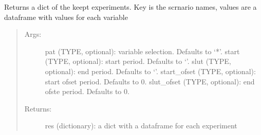 \documentclass[letterpaper,10pt,english]{sphinxmanual}
\begin{document}
\begin{fulllineitems}
\begin{fulllineitems}
\end{fulllineitems}


\begin{fulllineitems}
\label{\detokenize{core/modelclass:modelclass.Display_Mixin.keep_get_df}}
\pysigstartsignatures
{}
\pysigstopsignatures
\end{fulllineitems}


\begin{fulllineitems}
\label{\detokenize{core/modelclass:modelclass.Display_Mixin.keep_var_dict}}
\pysigstartsignatures
{}
\pysigstopsignatures
\sphinxAtStartPar
Returns a dict of the keept experiments. Key is the scrnario names, values are a dataframe with  values for each variable
\begin{quote}
\begin{description}
\item[{Args:}] \leavevmode
\sphinxAtStartPar
pat (TYPE, optional): variable selection. Defaults to ‘*’.
start (TYPE, optional): start period. Defaults to ‘’.
slut (TYPE, optional): end period. Defaults to ‘’.
start\_ofset (TYPE, optional): start ofset period. Defaults to 0.
slut\_ofset (TYPE, optional): end ofste period. Defaults to 0.

\item[{Returns:}] \leavevmode
\sphinxAtStartPar
res (dictionary): a dict with a dataframe for each experiment

\end{description}
\end{quote}


\end{fulllineitems}
\end{fulllineitems}
\end{document}
